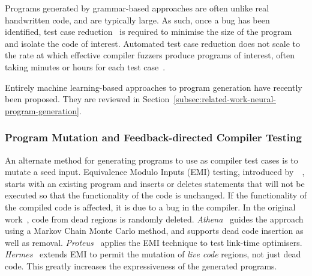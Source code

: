 
Programs generated by grammar-based approaches are often unlike real handwritten code, and are typically large. As such, once a bug has been identified, test case reduction~\cite{Regehr2012a} is required to minimise the size of the program and isolate the code of interest. Automated test case reduction does not scale to the rate at which effective compiler fuzzers produce programs of interest, often taking minutes or hours for each test case~\cite{Pflanzer2016}.

Entirely machine learning-based approaches to program generation have recently been proposed. They are reviewed in Section~\ref{subsec:related-work-neural-program-generation}.


\subsubsection{Program Mutation and Feedback-directed Compiler Testing}

An alternate method for generating programs to use as compiler test cases is to mutate a seed input.
Equivalence Modulo Inputs (EMI) testing, introduced by~\citeauthor{Le2013a}~\cite{Le2013a}, starts with an existing program and inserts or deletes statements that will not be executed so that the functionality of the code is unchanged. If the functionality of the compiled code is affected, it is due to a bug in the compiler. In the original work~\cite{Le2013a}, code from dead regions is randomly deleted.
\emph{Athena}~\cite{Le2015} guides the approach using a Markov Chain Monte Carlo method, and supports dead code insertion as well as removal.
\emph{Proteus}~\cite{Le2015a} applies the EMI technique to test link-time optimisers.
\emph{Hermes}~\cite{Sun2016a} extends EMI to permit the mutation of \emph{live code} regions, not just dead code. This greatly increases the expressiveness of the generated programs.

